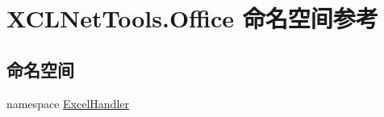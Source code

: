\hypertarget{namespace_x_c_l_net_tools_1_1_office}{}\section{X\+C\+L\+Net\+Tools.\+Office 命名空间参考}
\label{namespace_x_c_l_net_tools_1_1_office}
\subsection*{命名空间}
\begin{DoxyCompactItemize}
\item 
namespace \hyperlink{namespace_x_c_l_net_tools_1_1_office_1_1_excel_handler}{Excel\+Handler}
\end{DoxyCompactItemize}
